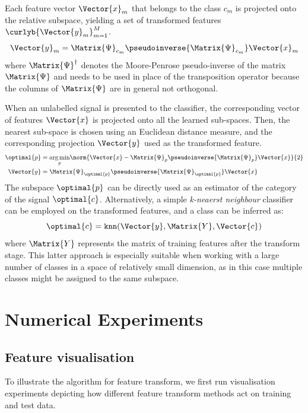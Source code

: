 \documentclass{article}
\def \fea{\Vector{x}} 	%
\def \iFea{n}	 		%
\def \newFea{\Vector{y}} 	%
\def \NewFeas{\Matrix{Y}}%
\def \nFea{M}			%
\def \iFea{m}			%
\def \cat{c} 			%
\def \cats{\Vector{c}}	%
\def \iCat{p}  		%
\def \Spa{\Matrix{\Psi}}
\begin{document}
Each feature vector $\fea_{\iFea}$ that belongs to the class $\cat_{\iFea}$ is projected onto the relative subspace, yielding a set of transformed features $\curlyb{\newFea_{\iFea}}_{\iFea=1}^{\nFea}$.
\begin{equation}
\newFea_{\iFea} = \Spa_{\cat_{\iFea}}\pseudoinverse{\Spa_{\cat_{\iFea}}}\fea_{\iFea}
\end{equation}
where $\Spa^{\dagger}$ denotes the Moore-Penrose pseudo-inverse of the matrix $\Spa$ and needs to be used in place of the transposition operator because the columns of $\Spa$ are in general not orthogonal.

When an unlabelled signal is presented to the classifier, the corresponding vector of features $\fea$ is projected onto all the learned sub-spaces. Then, the nearest sub-space is chosen using an Euclidean distance measure, and the corresponding projection $\newFea$ used as the transformed feature.
\begin{align}
	\optimal{\iCat} &= \underset{\iCat}{\arg\min}\norm{\fea-\Spa_{\iCat}\pseudoinverse{\Spa_{\iCat}}\fea}{2}	\\
	\newFea &= \Spa_{\optimal{\iCat}}\pseudoinverse{\Spa_{\optimal{\iCat}}}\fea
\end{align}
The subspace $\optimal{\iCat}$ can be directly used as an estimator of the category of the signal $\optimal{\cat}$. Alternatively, a simple \emph{k-neaerst neighbour} classifier can be employed on the transformed features, and a class can be inferred as:
\begin{equation}
\optimal{\cat} = \texttt{knn}(\newFea,\NewFeas,\cats)
\end{equation}
where $\NewFeas$ represents the matrix of training features after the transform stage. This latter approach is especially suitable when working with a large number of classes in a space of relatively small dimension, as in this case multiple classes might be assigned to the same subspace.
\section{Numerical Experiments}\label{sec:ne}
\subsection{Feature visualisation}\label{sec:visu}
To illustrate the  algorithm for feature transform, we first run visualisation experiments depicting how different feature transform methods act on training and test data.
\end{document}
